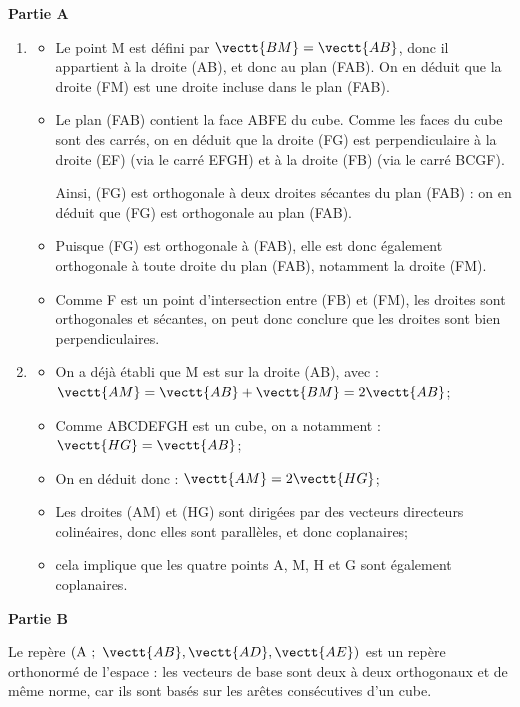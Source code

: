 \medskip

\textbf{Partie A}

\medskip

\begin{enumerate}
\item 
\begin{itemize}
\item Le point M est défini par $\vectt{BM} = \vectt{AB}$, donc il appartient à la droite (AB), et donc au plan (FAB). On en déduit que la droite (FM) est une droite incluse dans le plan (FAB).
\item Le plan (FAB) contient la face ABFE du cube. Comme les faces du cube sont des carrés, on en déduit que la droite (FG) est perpendiculaire  à la droite (EF) (via le carré EFGH) et à la droite (FB) (via le carré BCGF).

Ainsi, (FG) est orthogonale à deux droites sécantes du plan (FAB) : on en déduit que (FG) est orthogonale au plan (FAB).
\item Puisque (FG) est orthogonale à (FAB), elle est donc également orthogonale à toute droite du plan (FAB), notamment la droite (FM).
\item Comme F est un point d'intersection entre (FB) et (FM), les droites sont orthogonales et sécantes, on peut donc conclure que les droites sont bien perpendiculaires.
		\end{itemize}

\item 
\begin{itemize}
\item On a déjà établi que M est sur la droite (AB), avec : $\vectt{AM} = \vectt{AB} + \vectt{BM} = 2\vectt{AB}$;
\item Comme ABCDEFGH est un cube, on a notamment : $\vectt{HG} = \vectt{AB}$;
\item On en déduit donc : \quad $\vectt{AM} = 2\vectt{HG}$;
\item Les droites (AM) et (HG) sont dirigées par des vecteurs directeurs colinéaires, donc elles sont parallèles, et donc coplanaires;
\item cela implique que les quatre points A, M, H et G sont également coplanaires.
\end{itemize}
\end{enumerate}

\medskip

\textbf{Partie B}

\medskip

Le repère $\left(\mathrm{A} ~;~ \vectt{AB}, \vectt{AD}, \vectt{AE}\right)$ est un repère orthonormé de l'espace : les vecteurs de base sont deux à deux orthogonaux et de même norme, car ils sont basés sur les arêtes consécutives d'un cube.

